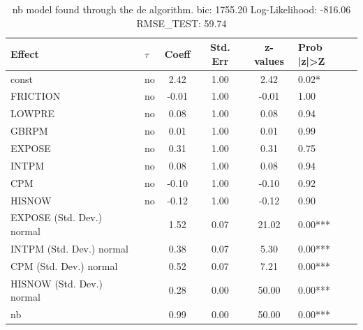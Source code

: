 \begin{table}
	\caption{nb model found through the de algorithm. bic: 1755.20 Log-Likelihood: -816.06 RMSE_TEST: 59.74}
	\begin{center}
		\begin{tabular}{|l|l|c|c|c|l|}
			\hline
			Effect & $\tau$ & Coeff & Std. Err & z-values & Prob |z|>Z \\
			\hline
			const & no & 2.42 & 1.00 & 2.42 & 0.02* \\
			\hline
			FRICTION & no & -0.01 & 1.00 & -0.01 & 1.00 \\
			\hline
			LOWPRE & no & 0.08 & 1.00 & 0.08 & 0.94 \\
			\hline
			GBRPM & no & 0.01 & 1.00 & 0.01 & 0.99 \\
			\hline
			EXPOSE & no & 0.31 & 1.00 & 0.31 & 0.75 \\
			\hline
			INTPM & no & 0.08 & 1.00 & 0.08 & 0.94 \\
			\hline
			CPM & no & -0.10 & 1.00 & -0.10 & 0.92 \\
			\hline
			HISNOW & no & -0.12 & 1.00 & -0.12 & 0.90 \\
			\hline
			EXPOSE (Std. Dev.) normal &  & 1.52 & 0.07 & 21.02 & 0.00*** \\
			\hline
			INTPM (Std. Dev.) normal &  & 0.38 & 0.07 & 5.30 & 0.00*** \\
			\hline
			CPM (Std. Dev.) normal &  & 0.52 & 0.07 & 7.21 & 0.00*** \\
			\hline
			HISNOW (Std. Dev.) normal &  & 0.28 & 0.00 & 50.00 & 0.00*** \\
			\hline
			nb &  & 0.99 & 0.00 & 50.00 & 0.00*** \\
			\hline
		\end{tabular}
	\end{center}
\end{table}